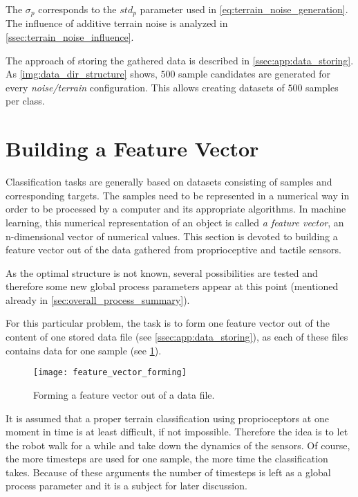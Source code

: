 The $ \sigma_p $ corresponds to the $ std_p $ parameter used in \cref{eq:terrain_noise_generation}. The influence of additive terrain noise is analyzed in \cref{ssec:terrain_noise_influence}.

The approach of storing the gathered data is described in \cref{ssec:app:data_storing}. As \cref{img:data_dir_structure} shows, $ 500 $ sample candidates are generated for every \textit{noise/terrain} configuration. This allows creating datasets of $ 500 $ samples per class.

\section{Building a Feature Vector} \label{sec:feature_vector_compilation}
Classification tasks are generally based on datasets consisting of samples and corresponding targets. The samples need to be represented in a numerical way in order to be processed by a computer and its appropriate algorithms. In machine learning, this numerical representation of an object is called \textit{a feature vector}, an n-dimensional vector of numerical values. This section is devoted to building a feature vector out of the data gathered from proprioceptive and tactile sensors.

As the optimal structure is not known, several possibilities are tested and therefore some new global process parameters appear at this point (mentioned already in \cref{sec:overall_process_summary}).

For this particular problem, the task is to form one feature vector out of the content of one stored data file (see \cref{ssec:app:data_storing}), as each of these files contains data for one sample (see \cref{img:feature_vector_forming}).

\begin{figure}[H]
  \centering
  \texttt{[image: feature\_vector\_forming]}
  \caption{Forming a feature vector out of a data file.}
  \label{img:feature_vector_forming}
\end{figure}

It is assumed that a proper terrain classification using proprioceptors at one moment in time is at least difficult, if not impossible. Therefore the idea is to let the robot walk for a while and take down the dynamics of the sensors. Of course, the more timesteps are used for one sample, the more time the classification takes. Because of these arguments the number of timesteps is left as a global process parameter and it is a subject for later discussion.

